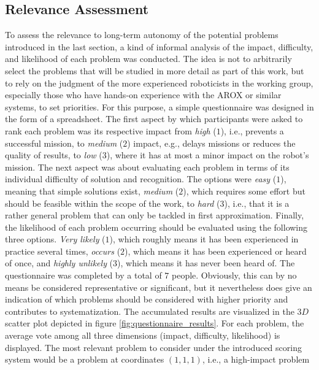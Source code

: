\documentclass[english, master, utf8]{base/thesis_KBS}
\begin{document}
\subsection{Relevance Assessment}
\label{sec:relevance_assessment}

To assess the relevance to long-term autonomy of the potential problems introduced in the last section, a kind of informal analysis of the impact,
difficulty, and likelihood of each problem was conducted. The idea is not to arbitrarily select the problems that will be studied in more detail as part
of this work, but to rely on the judgment of the more experienced roboticists in the working group, especially those who have hands-on experience with the
AROX or similar systems, to set priorities. For this purpose, a simple questionnaire was designed in the form of a spreadsheet. The first aspect by which participants
were asked to rank each problem was its respective impact from \textit{high} ($1$), i.e., prevents a successful mission, to \textit{medium} ($2$) impact, e.g., delays missions
or reduces the quality of results, to \textit{low} ($3$), where it has at most a minor impact on the robot's mission. The next aspect was about evaluating each problem in
terms of its individual difficulty of solution and recognition. The options were \textit{easy} ($1$), meaning that simple solutions exist, \textit{medium} ($2$), which
requires some effort but should be feasible within the scope of the work, to \textit{hard} ($3$), i.e., that it is a rather general problem that can only be tackled in first
approximation. Finally, the likelihood of each problem occurring should be evaluated using the following three options. \textit{Very likely} ($1$), which roughly means it has been
experienced in practice several times, \textit{occurs} ($2$), which means it has been experienced or heard of once, and \textit{highly unlikely} ($3$), which means it has never been
heard of. The questionnaire was completed by a total of $7$ people. Obviously, this can by no means be considered representative or significant, but it
nevertheless does give an indication of which problems should be considered with higher priority and contributes to systematization. The accumulated results are visualized in the
$3D$ scatter plot depicted in figure \ref{fig:questionnaire_results}. For each problem, the average vote among all three dimensions (impact, difficulty, likelihood) is displayed.
The most relevant problem to consider under the introduced scoring system would be a problem at coordinates $(1, 1, 1)$, i.e., a high-impact problem 
\end{document}
